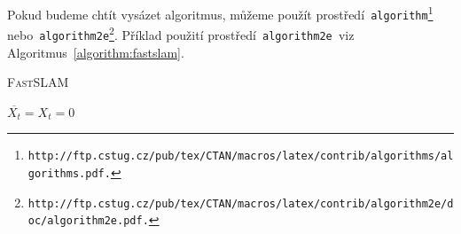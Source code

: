 \documentclass[a4paper, 11pt]{article}
\begin{document}
Pokud budeme chtít vysázet algoritmus, můžeme použít prostředí\texttt{ algorithm\footnote{
		http://ftp.cstug.cz/pub/tex/CTAN/macros/latex/contrib/algorithms/algorithms.pdf.
	} }
nebo\texttt{ algorithm2e\footnote{
		http://ftp.cstug.cz/pub/tex/CTAN/macros/latex/contrib/algorithm2e/doc/algorithm2e.pdf.
	}}. Příklad použití prostředí\texttt{ algorithm2e }viz Algoritmus~\ref{algorithm:fastslam}.
\bigskip
\IncMargin{1.5em}
\begin{algorithm}
	\caption{\textsc{FastSLAM}}
	\label{algorithm:fastslam}

	\SetNlSty{}{}{:}
	\SetInd{1em}{1em}

	\Indm\Indmm
	\Indp\Indpp
	$\overline{X_t} = X_t = 0$ \\
\end{algorithm}
\end{document}
